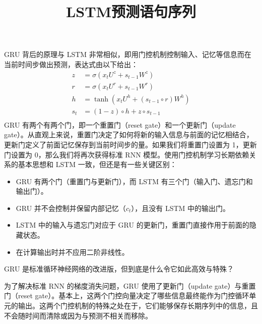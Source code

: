 \documentclass{article}
\title{LSTM预测语句序列}
\begin{document}
\maketitle
GRU 背后的原理与 LSTM 非常相似，即用门控机制控制输入、记忆等信息而在当前时间步做出预测，表达式由以下给出：
\begin{equation*}
	\begin{split}
	z&=\sigma(x_tU^z+s_{t-1}W^z)\\
	r&=\sigma(x_tU^r+s_{t-1}W^r)\\
	h&=\tanh(x_tU^h+(s_{t-1}\circ r)W^h)\\
	s_t&=(1-z)\circ h+z\circ s_{t-1}\\
	\end{split}
\end{equation*}
GRU 有两个有两个门，即一个重置门（reset gate）和一个更新门（update gate）。从直观上来说，重置门决定了如何将新的输入信息与前面的记忆相结合，更新门定义了前面记忆保存到当前时间步的量。如果我们将重置门设置为 1，更新门设置为 0，那么我们将再次获得标准 RNN 模型。使用门控机制学习长期依赖关系的基本思想和 LSTM 一致，但还是有一些关键区别：
\begin{itemize}
\item GRU 有两个门（重置门与更新门），而 LSTM 有三个门（输入门、遗忘门和输出门）。
\item GRU 并不会控制并保留内部记忆（$c_t$），且没有 LSTM 中的输出门。
\item LSTM 中的输入与遗忘门对应于 GRU 的更新门，重置门直接作用于前面的隐藏状态。
\item 在计算输出时并不应用二阶非线性。
\end{itemize}

GRU 是标准循环神经网络的改进版，但到底是什么令它如此高效与特殊？

为了解决标准 RNN 的梯度消失问题，GRU 使用了更新门（update gate）与重置门（reset gate）。基本上，这两个门控向量决定了哪些信息最终能作为门控循环单元的输出。这两个门控机制的特殊之处在于，它们能够保存长期序列中的信息，且不会随时间而清除或因为与预测不相关而移除。
\end{document}
